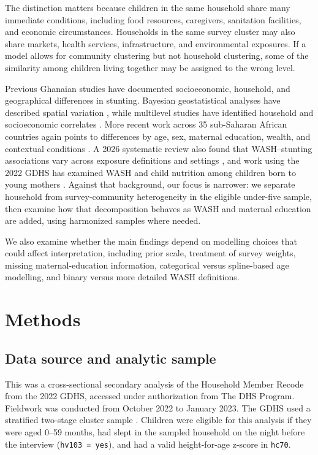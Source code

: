 \documentclass[11pt]{article}
\begin{document}
The distinction matters because children in the same household share many immediate conditions, including food resources, caregivers, sanitation facilities, and economic circumstances. Households in the same survey cluster may also share markets, health services, infrastructure, and environmental exposures. If a model allows for community clustering but not household clustering, some of the similarity among children living together may be assigned to the wrong level.

Previous Ghanaian studies have documented socioeconomic, household, and geographical differences in stunting. Bayesian geostatistical analyses have described spatial variation \citep{AhetoDagne2021,AmoakoJohnson2022}, while multilevel studies have identified household and socioeconomic correlates \citep{AhetoEtAl2015,IddrisuGyabaah2023}. More recent work across 35 sub-Saharan African countries again points to differences by age, sex, maternal education, wealth, and contextual conditions \citep{MoloroEtAl2026}. A 2026 systematic review also found that WASH--stunting associations vary across exposure definitions and settings \citep{WijayantoEtAl2026}, and work using the 2022 GDHS has examined WASH and child nutrition among children born to young mothers \citep{OgumEtAl2026}. Against that background, our focus is narrower: we separate household from survey-community heterogeneity in the eligible under-five sample, then examine how that decomposition behaves as WASH and maternal education are added, using harmonized samples where needed.

We also examine whether the main findings depend on modelling choices that could affect interpretation, including prior scale, treatment of survey weights, missing maternal-education information, categorical versus spline-based age modelling, and binary versus more detailed WASH definitions.

\section{Methods}

\subsection{Data source and analytic sample}

This was a cross-sectional secondary analysis of the Household Member Recode from the 2022 GDHS, accessed under authorization from The DHS Program. Fieldwork was conducted from October 2022 to January 2023. The GDHS used a stratified two-stage cluster sample \citep{GSSICF2024}. Children were eligible for this analysis if they were aged 0--59 months, had slept in the sampled household on the night before the interview (\texttt{hv103 = yes}), and had a valid height-for-age z-score in \texttt{hc70}.
\end{document}
